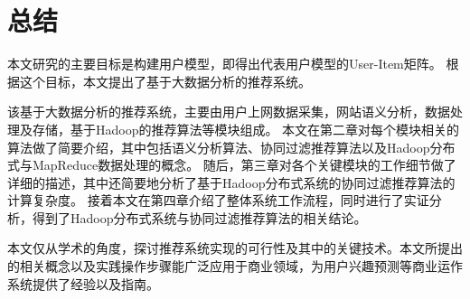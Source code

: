 \chapter{总结}
本文研究的主要目标是构建用户模型，即得出代表用户模型的User-Item矩阵。
根据这个目标，本文提出了基于大数据分析的推荐系统。

该基于大数据分析的推荐系统，主要由用户上网数据采集，网站语义分析，数据处理及存储，基于Hadoop的推荐算法等模块组成。
本文在第二章对每个模块相关的算法做了简要介绍，其中包括语义分析算法、协同过滤推荐算法以及Hadoop分布式与MapReduce数据处理的概念。
随后，第三章对各个关键模块的工作细节做了详细的描述，其中还简要地分析了基于Hadoop分布式系统的协同过滤推荐算法的计算复杂度。
接着本文在第四章介绍了整体系统工作流程，同时进行了实证分析，得到了Hadoop分布式系统与协同过滤推荐算法的相关结论。

本文仅从学术的角度，探讨推荐系统实现的可行性及其中的关键技术。本文所提出的相关概念以及实践操作步骤能广泛应用于商业领域，为用户兴趣预测等商业运作系统提供了经验以及指南。